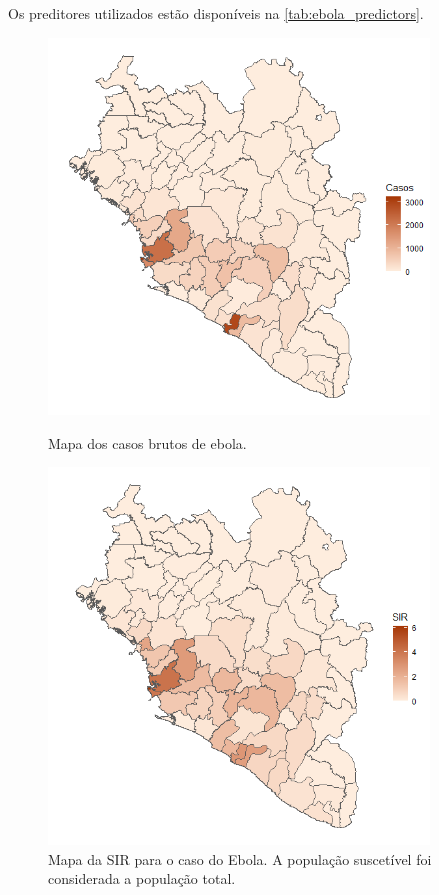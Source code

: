  Os preditores utilizados estão disponíveis na \autoref{tab:ebola_predictors}. 

\begin{figure}
    \centering
    \begin{minipage}{0.45\textwidth}
        \centering
        \includegraphics[width=0.9\textwidth]{images/raw_cases_ebola.png} %
        \caption{Mapa dos casos brutos de ebola.}
    \end{minipage}\hfill
    \begin{minipage}{0.45\textwidth}
        \centering
        \includegraphics[width=0.9\textwidth]{images/SIR_ebola.png} %
        \caption{Mapa da SIR para o caso do Ebola. A população suscetível foi considerada a população total.}
    \end{minipage}
\end{figure}

